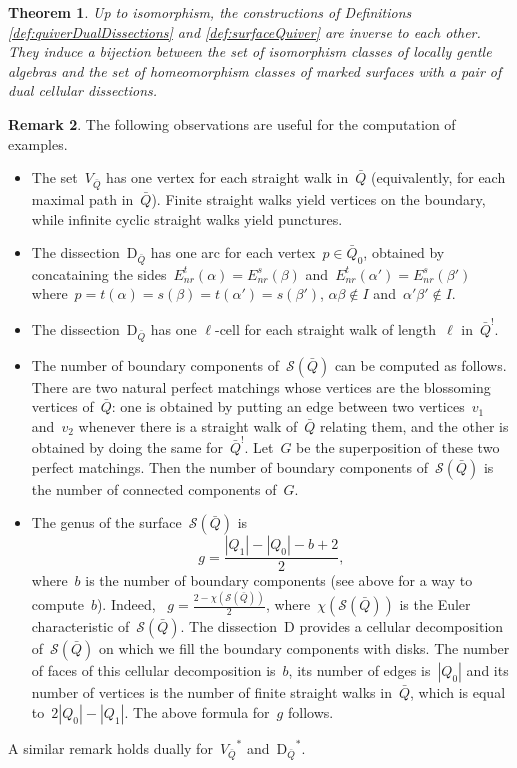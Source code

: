 \documentclass{amsart}
\newtheorem{theorem}{Theorem}[section]
\theoremstyle{definition}
\newtheorem{remark}[theorem]{Remark}
\newcommand{\pierreguy}[1]{\todo[color=green!30]{#1 \\ \hfill --- PG.}}
\newcommand{\Enrs}[1]{E_{nr}^{s}(#1)}
\newcommand{\Enrt}[1]{E_{nr}^{t}(#1)}
\newcommand{\surface}{\mathcal{S}} %
\newcommand{\dual}{^*} %
\newcommand{\dissection}{\mathrm{D}} %
\newcommand{\koszul}{^!} %
\begin{document}
\begin{theorem}
\label{thm:bijectionLocallyGentleAndSurfaces}
 Up to isomorphism, the constructions of Definitions \ref{def:quiverDualDissections} and \ref{def:surfaceQuiver} are inverse to each other.
 They induce a bijection between the set of isomorphism classes of locally gentle algebras and the set of homeomorphism classes of marked surfaces with a pair of dual cellular dissections.
\end{theorem}
\pierreguy{How much detail for a proof? Or is it clear?}



\begin{remark}
The following observations are useful for the computation of examples.
\begin{itemize}
\item The set~$V_{\bar Q}$ has one vertex for each straight walk in~$\bar Q$ (equivalently, for each maximal path in~$\bar Q$).
      Finite straight walks yield vertices on the boundary, while infinite cyclic straight walks yield punctures.
\item The dissection~$\dissection_{\bar Q}$ has one arc for each vertex~$p \in \bar Q_0$, obtained by concataining the sides~$\Enrt{\alpha} = \Enrs{\beta}$ and~$\Enrt{\alpha'} = \Enrs{\beta'}$ where~$p = t(\alpha) = s(\beta) = t(\alpha') = s(\beta')$, $\alpha\beta \notin I$ and~$\alpha'\beta' \notin I$.
\item The dissection~$\dissection_{\bar Q}$ has one $\ell$-cell for each straight walk of length~$\ell$ in~$\bar Q\koszul$.
\item The number of boundary components of~$\surface(\bar Q)$ can be computed as follows.
      There are two natural perfect matchings whose vertices are the blossoming vertices of~$\bar Q$: one is obtained by putting an edge between two vertices~$v_1$ and~$v_2$ whenever there is a straight walk of~$\bar Q$ relating them, and the other is obtained by doing the same for~$\bar Q \koszul$.
      Let~$G$ be the superposition of these two perfect matchings.
      Then the number of boundary components of~$\surface(\bar Q)$ is the number of connected components of~$G$.
\item The genus of the surface~$\surface(\bar Q)$ is
      \[
       g = \frac{|Q_1| - |Q_0| - b + 2}{2},
      \]
      where~$b$ is the number of boundary components (see above for a way to compute~$b$).
      Indeed, ~$g=\frac{2-\chi(\surface(\bar Q))}{2}$, where~$\chi(\surface(\bar Q))$ is the Euler characteristic of~$\surface(\bar Q)$.
      The dissection~$\dissection$ provides a cellular decomposition of~$\surface(\bar Q)$ on which we fill the boundary components with disks.  
      The number of faces of this cellular decomposition is~$b$, its number of edges is~$|Q_0|$ and its number of vertices is the number of finite straight walks in~$\bar Q$, which is equal to~$2|Q_0| - |Q_1|$.
      The above formula for~$g$ follows.
\end{itemize}
A similar remark holds dually for~${V_{\bar Q}}\dual$ and~${\dissection_{\bar Q}}\dual$.
\end{remark}
\end{document}
